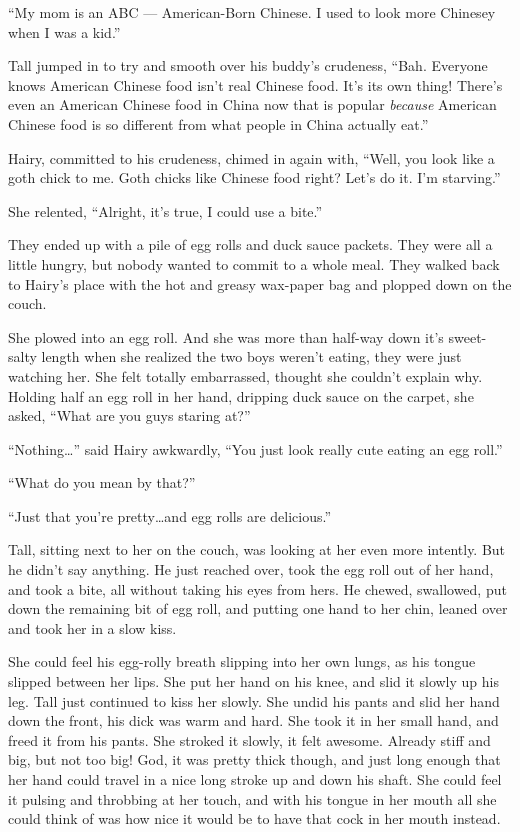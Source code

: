 \documentclass[letterpaper]{article}
\begin{document}
``My mom is an ABC --- American-Born Chinese. I used to look more Chinesey when I was a kid.''

Tall jumped in to try and smooth over his buddy's crudeness, ``Bah. Everyone knows American Chinese food isn't real Chinese food. It's its own thing! There's even an American Chinese food in China now that is popular \emph{because} American Chinese food is so different from what people in China actually eat.''

Hairy, committed to his crudeness, chimed in again with, ``Well, you look like a goth chick to me. Goth chicks like Chinese food right? Let's do it. I'm starving.''

She relented, ``Alright, it's true, I could use a bite.''

They ended up with a pile of egg rolls and duck sauce packets.
They were all a little hungry, but nobody wanted to commit to a whole meal.
They walked back to Hairy's place with the hot and greasy wax-paper bag and plopped down on the couch.

She plowed into an egg roll.
And she was more than half-way down it's sweet-salty length when she realized the two boys weren't eating, they were just watching her.
She felt totally embarrassed, thought she couldn't explain why.
Holding half an egg roll in her hand, dripping duck sauce on the carpet, she asked, ``What are you guys staring at?''

``Nothing\ldots'' said Hairy awkwardly, ``You just look really cute eating an egg roll.''

``What do you mean by that?''

``Just that you're pretty\ldots and egg rolls are delicious.''

Tall, sitting next to her on the couch, was looking at her even more intently.
But he didn't say anything. He just reached over, took the egg roll out of her hand, and took a bite, all without taking his eyes from hers.
He chewed, swallowed, put down the remaining bit of egg roll, and putting one hand to her chin, leaned over and took her in a slow kiss.

She could feel his egg-rolly breath slipping into her own lungs, as his tongue slipped between her lips.
She put her hand on his knee, and slid it slowly up his leg.
Tall just continued to kiss her slowly.
She undid his pants and slid her hand down the front, his dick was warm and hard.
She took it in her small hand, and freed it from his pants.
She stroked it slowly, it felt awesome. Already stiff and big, but not too big!
God, it was pretty thick though, and just long enough that her hand could travel in a nice long stroke up and down his shaft.
She could feel it pulsing and throbbing at her touch, and with his tongue in her mouth all she could think of was how nice it would be to have that cock in her mouth instead.
\end{document}
